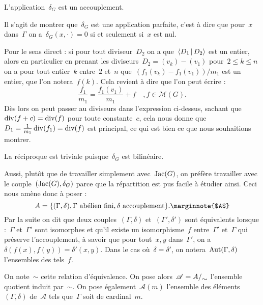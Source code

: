 	\begin{prop}
		L'application~$\delta_G$ est un accouplement.
	\end{prop}
	\begin{dem}
		Il s'agit de montrer que~$\delta_G$ est une application parfaite, c'est à dire que pour~$x$ dans~$\Gamma$ on a~$\delta_G(x,\cdot) = 0$ si et seulement si~$x$ est nul.
		
		Pour le sens direct : si pour tout diviseur~$D_2$ on a que~$\left<D_1\,|\,D_2\right>$ est un entier, alors en particulier en prenant les diviseurs~$D_2 = (v_k) - (v_1)$ pour~$2\leq k \leq n$ on a pour tout entier~$k$ entre~$2$ et~$n$ que~$(f_1(v_k)-f_1(v_1))/m_1$ est un entier, que l'on notera~$f(k)$. Cela revient à dire que l'on peut écrire :
		\[
			\frac{f_1}{m_1} = \frac{f_1(v_1)}{m_1} + f \quad , f\in\mathcal{M}(G).
		\]
		Dès lors on peut passer au diviseurs dans l'expression ci-dessus, sachant que~$\operatorname{div}(f+c) = \operatorname{div}(f)$ pour toute constante~$c$, cela nous donne que~$D_1 = \frac{1}{m_1}\operatorname{div}(f_1) = \operatorname{div}(f)$ est principal, ce qui est bien ce que nous souhaitions montrer.
		
		La réciproque est triviale puisque~$\delta_G$ est bilinéaire.
	\end{dem}
	Aussi, plutôt que de travailler simplement avec~$\operatorname{Jac}(G)$, on préfère travailler avec le couple~$(\operatorname{Jac}(G),\delta_G)$ parce que la répartition est pus facile à étudier ainsi. Ceci nous amène donc à poser :
	\[
		A = \{(\Gamma,\delta), \Gamma\text{ abélien fini}, \delta\text{ accouplement}\}.\text{\marginnote{$A$}}
	\]
	Par la suite on dit que deux couples~$(\Gamma,\delta)$ et~$(\Gamma',\delta')$ sont équivalents lorsque :~$\Gamma$ et~$\Gamma'$ sont isomorphes et qu'il existe un isomorphisme~$f$ entre~$\Gamma'$ et~$\Gamma$ qui préserve l'accouplement, à savoir que pour tout~$x,y$ dans~$\Gamma'$, on a~$\delta(f(x),f(y)) = \delta'(x,y)$. Dans le cas où~$\delta = \delta'$, on notera~$\Aut(\Gamma,\delta)$\marginnote{$\Aut(\Gamma,\delta)$} l'ensembles des tels~$f$.
	
	On note~$\sim$ cette relation d'équivalence. On pose alors~$\mathscr{A} = \quotient{A}{\sim}$ l'ensemble quotient induit par~$\sim$. On pose également~$\mathscr{A}(m)$  l'ensemble des éléments~$(\Gamma,\delta)$ de~$\mathscr{A}$ tels que~$\Gamma$ soit de cardinal~$m$.